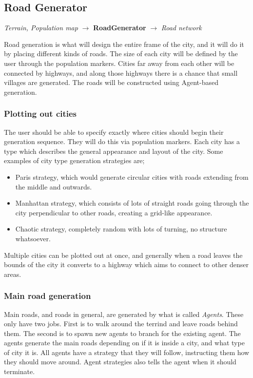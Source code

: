 \subsection{Road Generator}
\begin{center}
  \textit{Terrain, Population map} $\rightarrow$ \textbf{RoadGenerator} $\rightarrow$ \textit{Road network} 
\end{center}
Road generation is what will design the entire frame of the city, and it will do it by placing different kinds of roads.
The size of each city will be defined by the user through the population markers.
Cities far away from each other will be connected by highways, and along those highways there is a chance that small villages are generated.
The roads will be constructed using Agent-based generation.

\subsubsection{Plotting out cities}
The user should be able to specify exactly where cities should begin their generation sequence.
They will do this via population markers.
Each city has a type which describes the general appearance and layout of the city.
Some examples of city type generation strategies are;
\begin{itemize}
  \item Paris strategy, which would generate circular cities with roads extending from the middle and outwards.
  \item Manhattan strategy, which consists of lots of straight roads going through the city perpendicular to other roads, creating a grid-like appearance.
  \item Chaotic strategy, completely random with lots of turning, no structure whatsoever.
\end{itemize}

Multiple cities can be plotted out at once, and generally when a road leaves the bounds of the city it converts to a highway which aims to connect to other denser areas.

\subsubsection{Main road generation}
Main roads, and roads in general, are generated by what is called \textit{Agents}.
These only have two jobs.
First is to walk around the terrind and leave roads behind them.
The second is to spawn new agents to branch for the existing agent.
The agents generate the main roads depending on if it is inside a city, and what type of city it is.
All agents have a strategy that they will follow, instructing them how they should move around.
Agent strategies also tells the agent when it should terminate.

